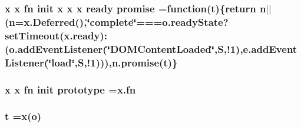 \hypertarget{jquery-2_80_83_8min_8js_ae956a9bca3451b56c70176dc10299813}{
\subsubsection[{promise}]{\setlength{\rightskip}{0pt plus 5cm}x x {\bf fn} init x x x {\bf ready} promise =function({\bf t})\{return n$\vert$$\vert$(n=x.\+Deferred(),\char`\"{}complete\char`\"{}===o.\+ready\+State?set\+Timeout({\bf x.\+ready})\+:(o.\+add\+Event\+Listener(\char`\"{}D\+O\+M\+Content\+Loaded\char`\"{},S,!1),e.\+add\+Event\+Listener(\char`\"{}load\char`\"{},S,!1))),n.\+promise({\bf t})\}}}\label{jquery-2_80_83_8min_8js_ae956a9bca3451b56c70176dc10299813}
\hypertarget{jquery-2_80_83_8min_8js_a0288e63a1ed58706e175fa8fbd67d19b}{
\subsubsection[{prototype}]{\setlength{\rightskip}{0pt plus 5cm}x x {\bf fn} init prototype ={\bf x.\+fn}}}\label{jquery-2_80_83_8min_8js_a0288e63a1ed58706e175fa8fbd67d19b}
\hypertarget{jquery-2_80_83_8min_8js_aaccc9105df5383111407fd5b41255e23}{
\subsubsection[{t}]{\setlength{\rightskip}{0pt plus 5cm}t =x(o)}}\label{jquery-2_80_83_8min_8js_aaccc9105df5383111407fd5b41255e23}
